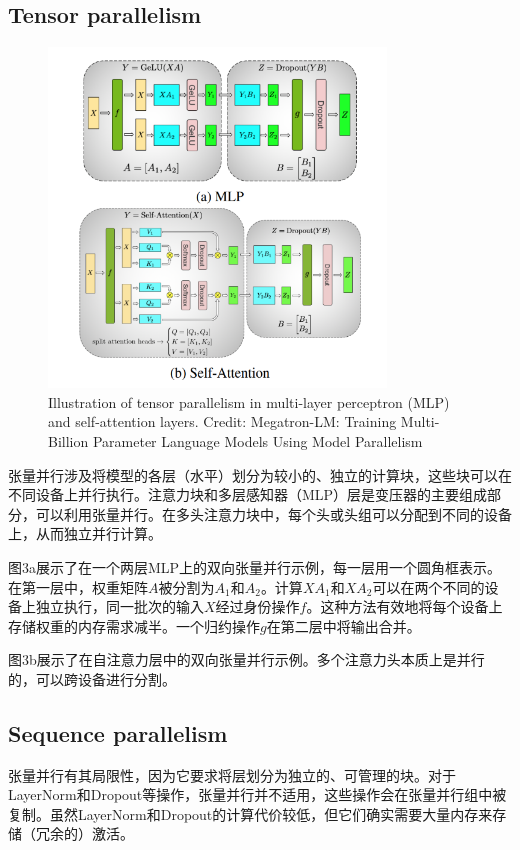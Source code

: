 \documentclass[twocolumn, 10pt]{article} %
\theoremstyle{remark}
\begin{document}
\subsection{Tensor parallelism}
\begin{figure}[ht]
    \centering
    \includegraphics[width=0.8\textwidth]{tensor-parallelsim-mlp-self-attention-layers_.png}
    \caption{Illustration of tensor parallelism in multi-layer perceptron (MLP) and self-attention layers. Credit: Megatron-LM: Training Multi-Billion Parameter Language Models Using Model Parallelism}
\end{figure}
张量并行涉及将模型的各层（水平）划分为较小的、独立的计算块，这些块可以在不同设备上并行执行。注意力块和多层感知器（MLP）层是变压器的主要组成部分，可以利用张量并行。在多头注意力块中，每个头或头组可以分配到不同的设备上，从而独立并行计算。

图3a展示了在一个两层MLP上的双向张量并行示例，每一层用一个圆角框表示。在第一层中，权重矩阵$A$被分割为$A_1$和$A_2$。计算$XA_1$和$XA_2$可以在两个不同的设备上独立执行，同一批次的输入$X$经过身份操作$f$。这种方法有效地将每个设备上存储权重的内存需求减半。一个归约操作$g$在第二层中将输出合并。


图3b展示了在自注意力层中的双向张量并行示例。多个注意力头本质上是并行的，可以跨设备进行分割。


\subsection{Sequence parallelism}
张量并行有其局限性，因为它要求将层划分为独立的、可管理的块。对于LayerNorm和Dropout等操作，张量并行并不适用，这些操作会在张量并行组中被复制。虽然LayerNorm和Dropout的计算代价较低，但它们确实需要大量内存来存储（冗余的）激活。
\end{document}
